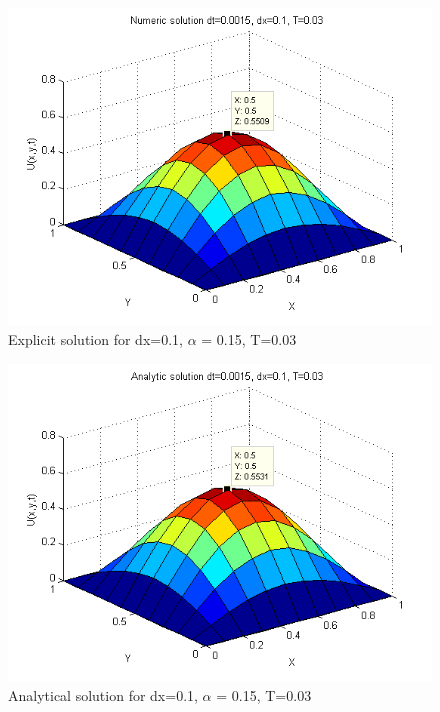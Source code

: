 \documentclass[a4paper,10pt]{article}
\begin{document}
\begin{figure}
  \begin{center}
    \includegraphics[scale=0.5]{num_dt00015_dx01_T003}
    \caption{Explicit solution for dx=0.1, $\alpha$ = 0.15, T=0.03}
    \label{fig:Num_alpha0.15}
  \end{center}

\end{figure}

\begin{figure}
  \begin{center}
    \includegraphics[scale=0.5]{ana_dt00015_dx01_T003}
    \caption{Analytical solution for dx=0.1, $\alpha$ = 0.15, T=0.03}
    \label{fig:Ana_alpha0.15}
  \end{center}

\end{figure}
\end{document}
